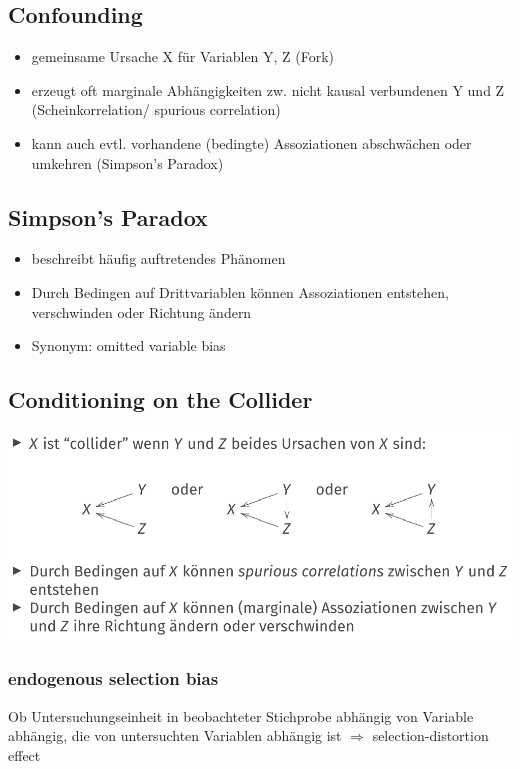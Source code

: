 \documentclass[10pt,a4paper,landscape]{article}
\begin{document}
\begin{multicols}{4}
\subsection{Confounding}
\begin{itemize}
\item gemeinsame Ursache X für Variablen Y, Z (Fork)
\item erzeugt oft marginale Abhängigkeiten zw. nicht kausal verbundenen Y und Z (Scheinkorrelation/ spurious correlation)
\item kann auch evtl. vorhandene (bedingte) Assoziationen abschwächen oder umkehren (Simpson's Paradox)
\end{itemize}

\subsection{Simpson's Paradox}
\begin{itemize}
\item beschreibt häufig auftretendes Phänomen
\item Durch Bedingen auf Drittvariablen können Assoziationen entstehen, verschwinden oder Richtung ändern
\item Synonym: omitted variable bias
\end{itemize}

\subsection{Conditioning on the Collider}
\includegraphics[scale=0.2]{Bilder/on the collider.png}

\subsubsection*{endogenous selection bias}
Ob Untersuchungseinheit in beobachteter Stichprobe abhängig von Variable abhängig, die von untersuchten Variablen abhängig ist $\Rightarrow$ selection-distortion effect


 

\end{multicols}
\end{document}
